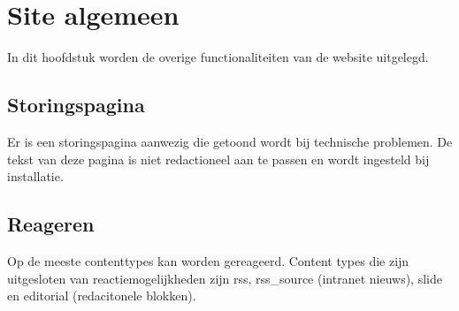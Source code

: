 
\section{Site algemeen}\label{sitealgemeen}
In dit hoofdstuk worden de overige functionaliteiten van de website uitgelegd.








\subsection{Storingspagina}

Er is een storingspagina aanwezig die getoond wordt bij technische problemen. De tekst van deze pagina is niet redactioneel aan te passen en wordt ingesteld bij installatie.

\subsection{Reageren}

Op de meeste contenttypes kan worden gereageerd. Content types die zijn uitgesloten van reactiemogelijkheden zijn rss, rss\_source (intranet nieuws), slide en editorial (redacitonele blokken).
